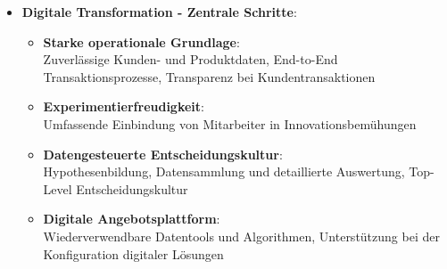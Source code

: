 \documentclass[12pt,a4paper]{article}
\begin{document}
\begin{itemize}
   \item \textbf{Digitale Transformation - Zentrale Schritte}:
      \begin{itemize}
			\item \textbf{Starke operationale Grundlage}: \\
			      Zuverlässige Kunden- und Produktdaten, End-to-End Transaktionsprozesse, Transparenz bei Kundentransaktionen
			\item \textbf{Experimentierfreudigkeit}: \\
			      Umfassende Einbindung von Mitarbeiter in Innovationsbemühungen
			\item \textbf{Datengesteuerte Entscheidungskultur}: \\
			      Hypothesenbildung, Datensammlung und detaillierte Auswertung, Top-Level Entscheidungskultur
			\item \textbf{Digitale Angebotsplattform}: \\
			      Wiederverwendbare Datentools und Algorithmen, Unterstützung bei der Konfiguration digitaler Lösungen
      \end{itemize}
\end{itemize}


\vspace*{0.5cm}
\end{document}
